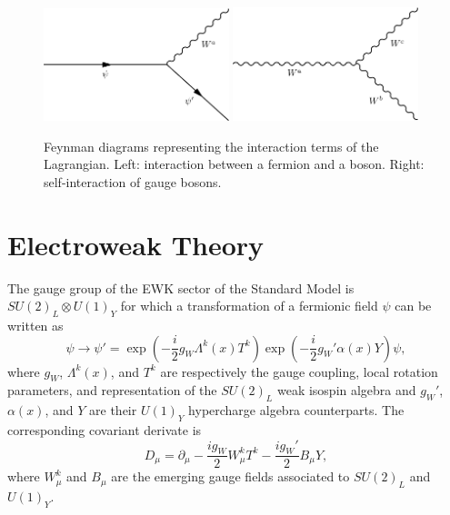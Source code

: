     \begin{figure}[t!]
      \centering
      \includegraphics[width=0.48\textwidth]{img/I-1-standard-model/diagram-fermion-boson.png}
      \includegraphics[width=0.48\textwidth]{img/I-1-standard-model/diagram-boson-boson.png}
      \caption{Feynman diagrams representing the interaction terms of the Lagrangian. Left: interaction between a fermion and a boson. Right: self-interaction of gauge bosons.}
      \label{fig:I-1-diagram}
    \end{figure}

  \section{Electroweak Theory}

    The gauge group of the EWK sector of the Standard Model is $ SU(2)_L \otimes U(1)_Y $ for which a transformation of a fermionic field $ \psi $ can be written as
    \begin{equation}
      \psi \rightarrow \psi' = \exp\left(- \frac{i}{2} g_W \Lambda^k(x) T^k \right) \exp\left(- \frac{i}{2} g_W' \alpha(x) Y \right) \psi ,
    \end{equation}
    where $ g_W $, $ \Lambda^k(x) $, and $ T^k $ are respectively the gauge coupling, local rotation parameters, and representation of the $ SU(2)_L $ weak isospin algebra and $ g_W' $, $ \alpha(x) $, and $ Y $ are their $ U(1)_Y $ hypercharge algebra counterparts. The corresponding covariant derivate is
    \begin{equation}
      D_\mu = \partial_\mu - \frac{i g_W}{2} W^k_\mu T^k - \frac{i g_W'}{2} B_\mu Y ,
    \end{equation}
    where $ W^k_\mu $ and $ B_\mu$ are the emerging gauge fields associated to $ SU(2)_L $ and $ U(1)_Y $. \\

